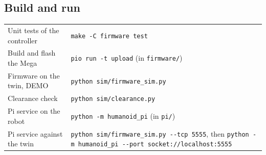 \documentclass[11pt,a4paper]{article}
\newcommand{\file}[1]{{\small\nolinkurl{#1}}}
\begin{document}
\subsection{Build and run}
{\small
\begin{tabularx}{\linewidth}{@{}P{58mm}L@{}}
Unit tests of the controller & \file{make -C firmware test}\\
Build and flash the Mega & \file{pio run -t upload} (in \file{firmware/})\\
Firmware on the twin, DEMO & \file{python sim/firmware_sim.py}\\
Clearance check & \file{python sim/clearance.py}\\
Pi service on the robot & \file{python -m humanoid_pi} (in \file{pi/})\\
Pi service against the twin & \file{python sim/firmware_sim.py --tcp 5555}, then \file{python -m humanoid_pi --port socket://localhost:5555}\\
\end{tabularx}}
\end{document}
